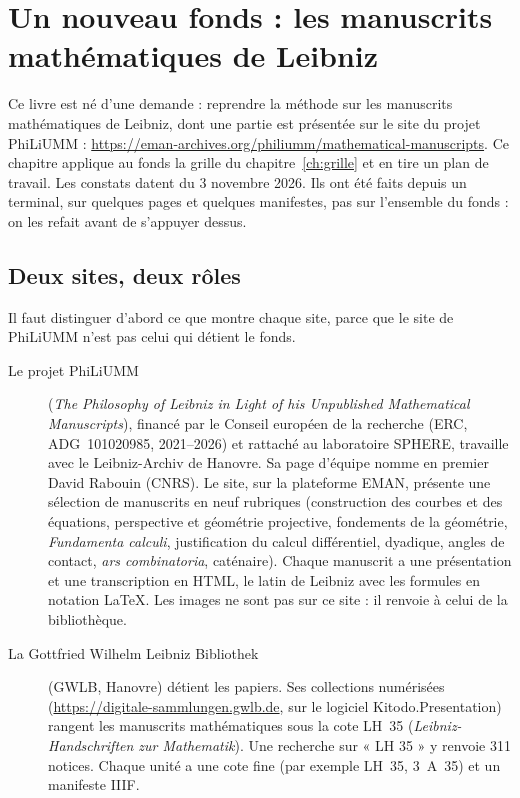 \chapter{Un nouveau fonds : les manuscrits mathématiques de Leibniz}\label{ch:leibniz}

Ce livre est né d'une demande : reprendre la méthode sur les manuscrits mathématiques de Leibniz, dont une partie est
présentée sur le site du projet PhiLiUMM :
\url{https://eman-archives.org/philiumm/mathematical-manuscripts}. Ce chapitre applique
au fonds la grille du chapitre~\ref{ch:grille} et en tire un plan de travail. Les constats
datent du 3 novembre 2026. Ils ont été faits depuis un terminal, sur quelques pages et
quelques manifestes, pas sur l'ensemble du fonds : on les refait avant de s'appuyer
dessus.

\section{Deux sites, deux rôles}

Il faut distinguer d'abord ce que montre chaque site, parce que le site de PhiLiUMM
n'est pas celui qui détient le fonds.

\begin{description}
  \item[Le projet PhiLiUMM] (\emph{The Philosophy of Leibniz in Light of his Unpublished
        Mathematical Manuscripts}), financé par le Conseil européen de la recherche
        (ERC, ADG~101020985, 2021--2026) et rattaché au laboratoire SPHERE, travaille avec
        le Leibniz-Archiv de Hanovre. Sa page d'équipe nomme en premier David Rabouin
        (CNRS). Le site, sur la plateforme EMAN, présente une sélection de manuscrits en
        neuf rubriques (construction des courbes et des équations, perspective et géométrie
        projective, fondements de la géométrie, \emph{Fundamenta calculi}, justification
        du calcul différentiel, dyadique, angles de contact, \emph{ars combinatoria},
        caténaire). Chaque manuscrit a une présentation et une transcription en HTML, le
        latin de Leibniz avec les formules en notation LaTeX. Les images ne sont pas sur
        ce site : il renvoie à celui de la bibliothèque.
  \item[La Gottfried Wilhelm Leibniz Bibliothek] (GWLB, Hanovre) détient les papiers. Ses
        collections numérisées (\url{https://digitale-sammlungen.gwlb.de}, sur le logiciel
        Kitodo.Presentation) rangent les manuscrits mathématiques sous la cote LH~35
        (\emph{Leibniz-Handschriften zur Mathematik}). Une recherche sur « LH 35 » y renvoie
        311 notices. Chaque unité a une cote fine (par exemple LH~35, 3~A~35) et un
        manifeste IIIF.
\end{description}

